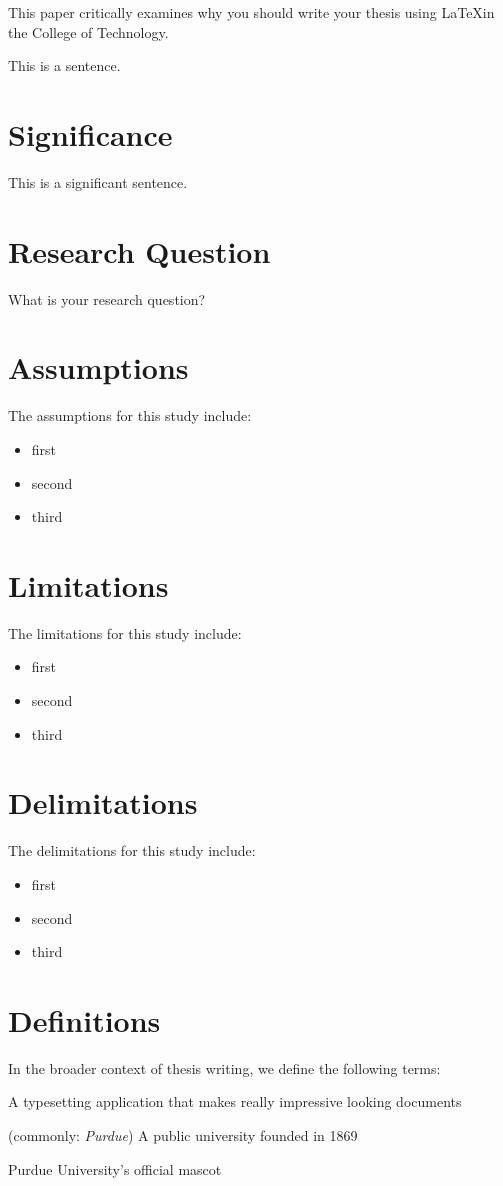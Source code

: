 This paper critically examines why you should write your thesis using \LaTeX in the College of Technology.

This is a sentence.


\section{Significance}

This is a significant sentence.


\section{Research Question}

What is your research question?


\section{Assumptions}

The assumptions for this study include:
\begin{itemize}
\item first
\item second
\item third
\end{itemize}


\section{Limitations}

The limitations for this study include:
\begin{itemize}
\item first
\item second
\item third
\end{itemize}


\section{Delimitations}

The delimitations for this study include:
\begin{itemize}
\item first
\item second
\item third
\end{itemize}


\section{Definitions}
In the broader context of thesis writing, we define the following terms:
\begin{italicdesc}
\item[\LaTeX:] A typesetting application that makes really impressive looking documents
\item[Purdue University:] (commonly: \textit{Purdue}) A public university founded in 1869
\item[Boilermakers:] Purdue University's official mascot
\end{italicdesc}


